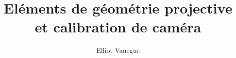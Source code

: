 \documentclass[a4paper,10pt]{article}
\title{Eléments de géométrie projective et calibration de caméra}
\author{Elliot Vanegue}
\begin{document}
\maketitle



\section{}
\end{document}
